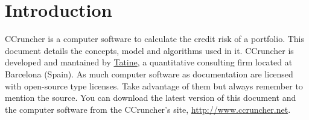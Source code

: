 \documentclass[11pt,fleqn]{book} %
\begin{document}



\pagestyle{empty} %
\tableofcontents %
\cleardoublepage %
\pagestyle{fancy} %


\chapter{Introduction}

CCruncher is a computer software to calculate the credit 
risk of a portfolio. This document details the concepts, model and algorithms 
used in it. CCruncher is developed and mantained by 
\href{http://www.tatine.es}{Tatine}, a quantitative consulting 
firm located at Barcelona (Spain). As much computer 
software as documentation are licensed with open-source 
type licenses. Take advantage of them but always remember to 
mention the source. You can download the latest version of this document and 
the computer software from the CCruncher's site, \url{http://www.ccruncher.net}.
\end{document}
